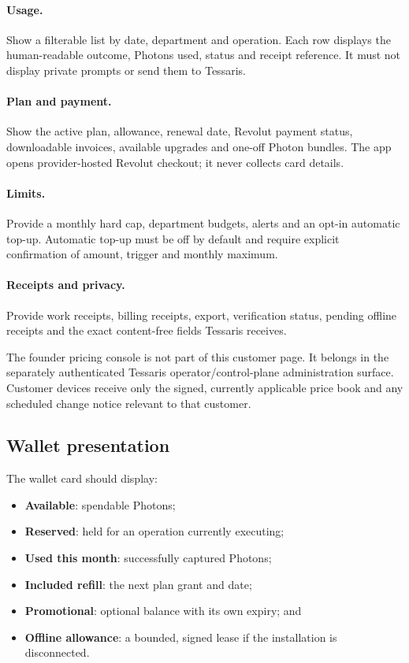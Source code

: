 \documentclass[11pt]{article}
\begin{document}
\paragraph{Usage.}
Show a filterable list by date, department and operation. Each row displays the human-readable outcome, Photons used, status and receipt reference. It must not display private prompts or send them to Tessaris.

\paragraph{Plan and payment.}
Show the active plan, allowance, renewal date, Revolut payment status, downloadable invoices, available upgrades and one-off Photon bundles. The app opens provider-hosted Revolut checkout; it never collects card details.

\paragraph{Limits.}
Provide a monthly hard cap, department budgets, alerts and an opt-in automatic top-up. Automatic top-up must be off by default and require explicit confirmation of amount, trigger and monthly maximum.

\paragraph{Receipts and privacy.}
Provide work receipts, billing receipts, export, verification status, pending offline receipts and the exact content-free fields Tessaris receives.

The founder pricing console is not part of this customer page. It belongs in the separately authenticated Tessaris operator/control-plane administration surface. Customer devices receive only the signed, currently applicable price book and any scheduled change notice relevant to that customer.

\subsection{Wallet presentation}

The wallet card should display:

\begin{itemize}
  \item \textbf{Available}: spendable Photons;
  \item \textbf{Reserved}: held for an operation currently executing;
  \item \textbf{Used this month}: successfully captured Photons;
  \item \textbf{Included refill}: the next plan grant and date;
  \item \textbf{Promotional}: optional balance with its own expiry; and
  \item \textbf{Offline allowance}: a bounded, signed lease if the installation is disconnected.
\end{itemize}
\end{document}
